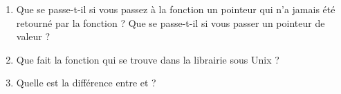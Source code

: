 \begin{Exercise}[title={Malloc, free et mmap}]
\begin{enumerate}
\item Que se passe-t-il si vous passez à la fonction 
  un pointeur qui n'a jamais été retourné par la fonction
   ? Que se passe-t-il si vous passer un pointeur
  de valeur  ?
\item Que fait la fonction  qui se trouve dans la
  librairie  sous Unix ?
\item Quelle est la différence entre  et  ?
\end{enumerate}
\end{Exercise}
